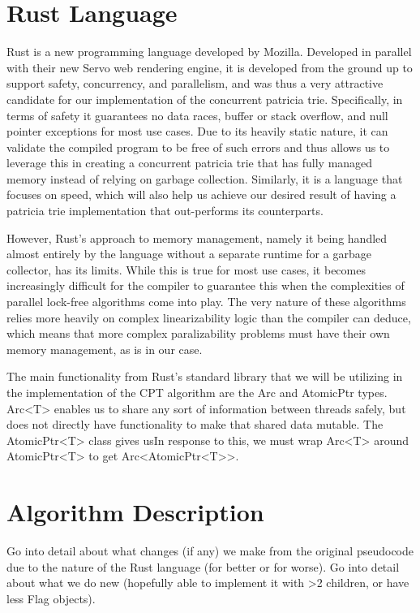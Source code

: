 \documentclass[conference]{IEEEtran}
\begin{document}
\section{Rust Language}
Rust is a new programming language developed by Mozilla. Developed in parallel with their new Servo web rendering engine, it is developed from the ground up to support safety, concurrency, and parallelism, and was thus a very attractive candidate for our implementation of the concurrent patricia trie.\cite{MozillaResearch} Specifically, in terms of safety it guarantees no data races, buffer or stack overflow, and null pointer exceptions for most use cases. Due to its heavily static nature, it can validate the compiled program to be free of such errors and thus allows us to leverage this in creating a concurrent patricia trie that has fully managed memory instead of relying on garbage collection. Similarly, it is a language that focuses on speed, which will also help us achieve our desired result of having a patricia trie implementation that out-performs its counterparts. 
\par
However, Rust's approach to memory management, namely it being handled almost entirely by the language without a separate runtime for a garbage collector, has its limits. While this is true for most use cases, it becomes increasingly difficult for the compiler to guarantee this when the complexities of parallel lock-free algorithms come into play. The very nature of these algorithms relies more heavily on complex linearizability logic than the compiler can deduce, which means that more complex paralizability problems must have their own memory management, as is in our case.
\par
The main functionality from Rust's standard library that we will be utilizing in the implementation of the CPT algorithm are the Arc and AtomicPtr types. Arc<T> enables us to share any sort of information between threads safely, but does not directly have functionality to make that shared data mutable. The AtomicPtr<T> class gives usIn response to this, we must wrap Arc<T> around AtomicPtr<T> to get Arc<AtomicPtr<T>>. 


\section{Algorithm Description}
Go into detail about what changes (if any) we make from the original pseudocode due to the nature of the Rust language (for better or for worse). Go into detail about what we do new (hopefully able to implement it with >2 children, or have less Flag objects).
\end{document}
